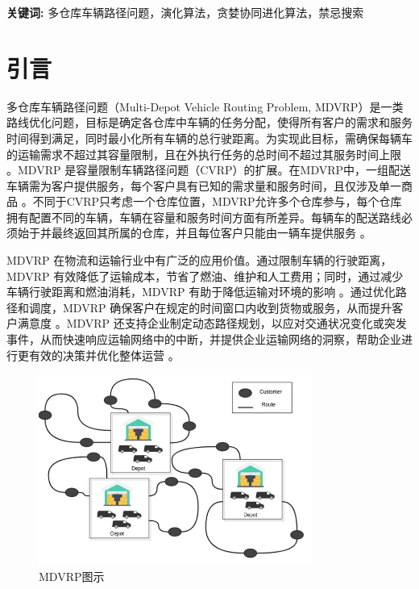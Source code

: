 \documentclass[12pt,a4paper,oneside]{ctexart}
\begin{document}
\textbf{关键词:} 多仓库车辆路径问题，演化算法，贪婪协同进化算法，禁忌搜索 \\

	
	\newpage
	\tableofcontents
	\newpage
	
\section{引言}

多仓库车辆路径问题（Multi-Depot Vehicle Routing Problem, MDVRP）是一类路线优化问题，目标是确定各仓库中车辆的任务分配，使得所有客户的需求和服务时间得到满足，同时最小化所有车辆的总行驶距离。为实现此目标，需确保每辆车的运输需求不超过其容量限制，且在外执行任务的总时间不超过其服务时间上限 \cite{laporte1987exact, golden1998impact}。MDVRP 是容量限制车辆路径问题（CVRP）的扩展。在MDVRP中，一组配送车辆需为客户提供服务，每个客户具有已知的需求量和服务时间，且仅涉及单一商品 \cite{cordeau1997savings}。不同于CVRP只考虑一个仓库位置，MDVRP允许多个仓库参与，每个仓库拥有配置不同的车辆，车辆在容量和服务时间方面有所差异。每辆车的配送路线必须始于并最终返回其所属的仓库，并且每位客户只能由一辆车提供服务 \cite{salhi1991multi}。

MDVRP 在物流和运输行业中有广泛的应用价值。通过限制车辆的行驶距离，MDVRP 有效降低了运输成本，节省了燃油、维护和人工费用；同时，通过减少车辆行驶距离和燃油消耗，MDVRP 有助于降低运输对环境的影响 \cite{reimann2004heuristic, venkatesh2015hybrid}。通过优化路径和调度，MDVRP 确保客户在规定的时间窗口内收到货物或服务，从而提升客户满意度 \cite{clarke1964savings}。MDVRP 还支持企业制定动态路径规划，以应对交通状况变化或突发事件，从而快速响应运输网络中的中断，并提供企业运输网络的洞察，帮助企业进行更有效的决策并优化整体运营 \cite{ai2009particle, golden1998impact}。

\begin{figure}[htbp]
	\centering
	\includegraphics[width=0.8\textwidth]{fig/1.jpg}
	\caption{MDVRP图示}
	\label{fig:1}
\end{figure}
\end{document}
